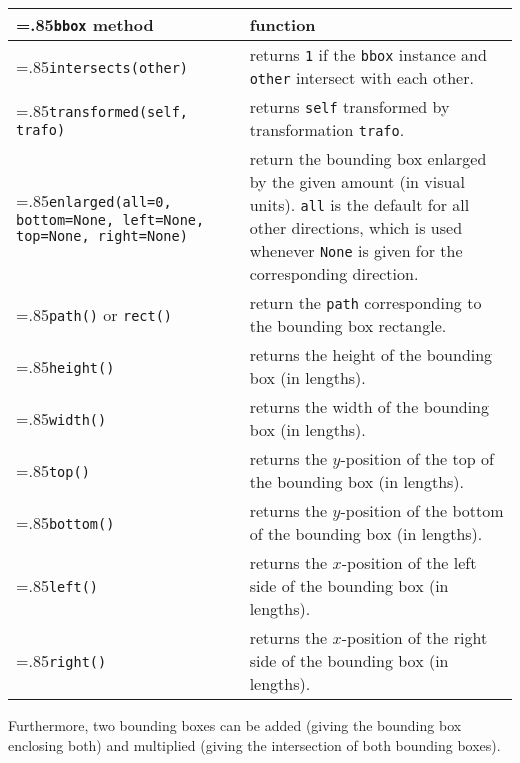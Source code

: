 \begin{tabularx}
  {\linewidth}
  {>{\hsize=.85\hsize}X>{\raggedright\arraybackslash\hsize=1.15\hsize}X}
  \texttt{bbox} method & function \\
  \hline
  \texttt{intersects(other)} & returns \texttt{1} if the \texttt{bbox} instance
  and \texttt{other} intersect with each other.\\
  \texttt{transformed(self, trafo)}& returns \texttt{self} transformed
  by transformation \texttt{trafo}.\\
  \texttt{enlarged(all=0, bottom=None,
    \newline\phantom{enlarged(}left=None, top=None,
    \newline\phantom{enlarged(}right=None)} &
  return the bounding box enlarged by the given amount (in visual
  units). \texttt{all} is the default for all other directions, which
  is used whenever \texttt{None} is given for the corresponding
  direction.\\
  \texttt{path()} or \texttt{rect()} & return the \texttt{path} corresponding to the
  bounding box rectangle.\\
  \texttt{height()} & returns the height of the bounding box (in \PyX{}
  lengths).\\
  \texttt{width()} & returns the width of the bounding box (in \PyX{}
  lengths).\\
  \texttt{top()} & returns the $y$-position of the top of the bounding
  box (in \PyX{} lengths).\\
  \texttt{bottom()} & returns the $y$-position of the bottom of the
  bounding box (in \PyX{} lengths).\\
  \texttt{left()} & returns the $x$-position of the left side of the
  bounding box (in \PyX{} lengths).\\
  \texttt{right()} & returns the $x$-position of the right side of the
  bounding box (in \PyX{} lengths).\\
  \end{tabularx}
\medskip

Furthermore, two bounding boxes can be added (giving the bounding box
enclosing both) and multiplied (giving the intersection of both
bounding boxes).


